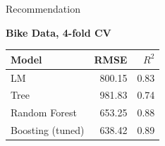 \documentclass[11pt,compress,t,notes=noshow, aspectratio=169, xcolor=table]{beamer}
\begin{document}
\begin{frame}{Recommendation}

\centering \textbf{Bike Data, 4-fold CV}
\begin{table}[ht]
\centering
\begin{tabular}{lrr}
  \hline
Model & RMSE & $R^2$ \\ 
  \hline
  LM & 800.15 & 0.83 \\ 
  Tree & 981.83 & 0.74 \\ 
  Random Forest & 653.25 & 0.88 \\ 
  Boosting (tuned) & 638.42 & 0.89 \\ 
   \hline
\end{tabular}
\end{table}
\end{frame}



\endlecture
\end{document}
